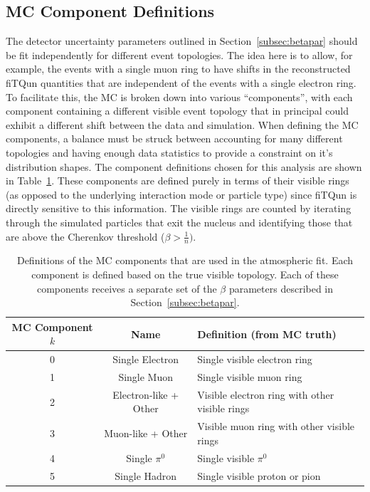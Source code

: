 \subsection{MC Component Definitions}
\label{subsec:components}

The detector uncertainty parameters outlined in Section~\ref{subsec:betapar}
should be fit independently for different event topologies. The idea here is to
allow, for example, the events with a single muon ring to have shifts in the
reconstructed fiTQun quantities that are independent of the events with a
single electron ring.  To facilitate this, the MC is broken down into various
``components'', with each component containing a different visible event
topology that in principal could exhibit a different shift between the data and
simulation.  When defining the MC components, a balance must be struck between
accounting for many different topologies and having enough data statistics to
provide a constraint on it's distribution shapes.  The component definitions
chosen for this analysis are shown in Table~\ref{tab:components}.  These
components are defined purely in terms of their visible rings (as opposed to
the underlying interaction mode or particle type) since fiTQun is directly
sensitive to this information.  The visible rings are counted by iterating
through the simulated particles that exit the nucleus and identifying those
that are above the Cherenkov threshold ($\beta > \frac{1}{n})$.

\begin{table}
  \centering
  \begin{tabular}{c | c | l }
    \hline\hline
    MC Component $k$ & Name & Definition (from MC truth) \\
    \hline
    0 & Single Electron & Single visible electron ring \\
    1 & Single Muon & Single visible muon ring  \\
    2 & Electron-like + Other & Visible electron ring with other visible rings  \\
    3 & Muon-like + Other & Visible muon ring with other visible rings  \\
    4 & Single $\pi^{0}$ & Single visible $\pi^{0}$  \\
    5 & Single Hadron &Single visible proton or pion  \\
    \hline\hline
  \end{tabular}
  \caption{Definitions of the MC components that are used in the atmospheric
  fit.  Each component is defined based on the true visible topology. Each of these
  components receives a separate set of the $\beta$ parameters described in
  Section~\ref{subsec:betapar}. }
  \label{tab:components}
\end{table}



